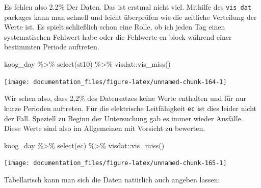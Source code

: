 \documentclass[
]{article}
\newenvironment{Shaded}{\begin{snugshade}}{\end{snugshade}}
\newcommand{\FunctionTok}[1]{\textcolor[rgb]{0.00,0.00,0.00}{#1}}
\newcommand{\NormalTok}[1]{#1}
\newcommand{\SpecialCharTok}[1]{\textcolor[rgb]{0.00,0.00,0.00}{#1}}
\begin{document}
Es fehlen also 2.2\% Der Daten. Das ist erstmal nicht viel. Mithilfe des \texttt{vis\_dat} packages kann man schnell und leicht überprüfen wie die zeitliche Verteilung der Werte ist. Es spielt schließlich schon eine Rolle, ob ich jeden Tag einen systematischen Fehlwert habe oder die Fehlwerte en block während einer bestimmten Periode auftreten.

\begin{Shaded}
\begin{Highlighting}[]
\NormalTok{koog\_day }\SpecialCharTok{\%\textgreater{}\%}
  \FunctionTok{select}\NormalTok{(st10) }\SpecialCharTok{\%\textgreater{}\%}
\NormalTok{  visdat}\SpecialCharTok{::}\FunctionTok{vis\_miss}\NormalTok{()}
\end{Highlighting}
\end{Shaded}

\begin{center}\texttt{[image: documentation\_files/figure-latex/unnamed-chunk-164-1]} \end{center}

Wir sehen also, dass 2,2\% des Datensatzes keine Werte enthalten und für nur kurze Perioden auftreten. Für die elektrische Leitfähigkeit \texttt{ec} ist dies leider nicht der Fall. Speziell zu Beginn der Untersuchung gab es immer wieder Ausfälle. Diese Werte sind also im Allgemeinen mit Vorsicht zu bewerten.

\begin{Shaded}
\begin{Highlighting}[]
\NormalTok{koog\_day }\SpecialCharTok{\%\textgreater{}\%}
  \FunctionTok{select}\NormalTok{(ec) }\SpecialCharTok{\%\textgreater{}\%}
\NormalTok{  visdat}\SpecialCharTok{::}\FunctionTok{vis\_miss}\NormalTok{()}
\end{Highlighting}
\end{Shaded}

\begin{center}\texttt{[image: documentation\_files/figure-latex/unnamed-chunk-165-1]} \end{center}

Tabellarisch kann man sich die Daten natürlich auch angeben lassen:
\end{document}
